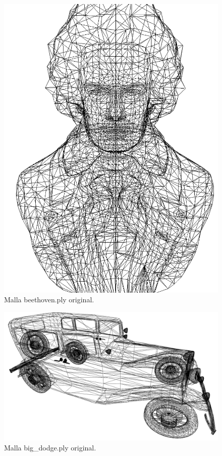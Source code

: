 \begin{figure} %
	\centering
	\includegraphics[scale=0.3]{imagenes/beethoven_100.png} 
	\caption{Malla beethoven.ply original.} \label{fig:beethoven_100.png}
\end{figure}

\begin{figure} %
	\centering
	\includegraphics[scale=0.2]{imagenes/coche_100.png} 
	\caption{Malla big\_dodge.ply original.} \label{fig:coche_100.png}
\end{figure}

